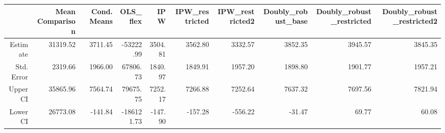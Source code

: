 \begin{table}[ht]
\centering
\begin{tabular}{rrrrrrrrrr}
  \hline
 & Mean Comparison & Cond. Means & OLS\_flex & IPW & IPW\_restricted & IPW\_restricted2 & Doubly\_robust\_base & Doubly\_robust\_restricted & Doubly\_robust\_restricted2 \\ 
  \hline
Estimate & 31319.52 & 3711.45 & -53222.99 & 3504.81 & 3562.80 & 3332.57 & 3852.35 & 3945.57 & 3845.35 \\ 
  Std. Error & 2319.66 & 1966.00 & 67806.73 & 1840.97 & 1849.91 & 1957.20 & 1898.80 & 1901.77 & 1957.21 \\ 
  Upper CI & 35865.96 & 7564.74 & 79675.75 & 7252.17 & 7266.88 & 7252.64 & 7637.32 & 7697.56 & 7821.94 \\ 
  Lower CI & 26773.08 & -141.84 & -186121.73 & -147.90 & -157.28 & -556.22 & -31.47 & 69.77 & 60.08 \\ 
   \hline
\end{tabular}
\end{table}
